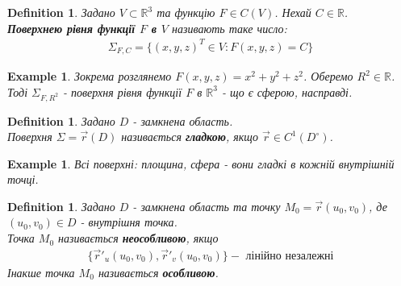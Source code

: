 \documentclass[a4paper, 10pt]{article}
\theoremstyle{theoremdd}
\theoremstyle{theoremdd}
\newtheorem{definition}[theorem]{Definition}
\theoremstyle{theoremdd}
\theoremstyle{theoremdd}
\newtheorem{example}[theorem]{Example}
\theoremstyle{theoremdd}
\theoremstyle{theoremdd}
\theoremstyle{theoremdd}
\theoremstyle{theoremdd}
\begin{document}
\begin{definition}
Задано $V \subset \mathbb{R}^3$ та функцію $F \in C(V)$. Нехай $C \in \mathbb{R}$.\\
\textbf{Поверхнею рівня функції $F$ в $V$} називають таке число:
\begin{align*}
\Sigma_{F,C} = \{ (x,y,z)^T \in V: F(x,y,z) = C\}
\end{align*}
\end{definition}

\begin{example}
Зокрема розглянемо $F(x,y,z) = x^2+y^2+z^2$. Оберемо $R^2 \in \mathbb{R}$.\\
Тоді $\Sigma_{F,R^2}$ - поверхня рівня функції $F$ в $\mathbb{R}^3$ - що є сферою, насправді.
\end{example}

\begin{definition}
Задано $D$ - замкнена область.\\
Поверхня $\Sigma = \vec{r}(D)$ називається \textbf{гладкою}, якщо $\vec{r} \in C^1(D^\circ)$.
\end{definition}

\begin{example}
Всі поверхні: площина, сфера - вони гладкі в кожній внутрішній точці.
\end{example}

\begin{definition}
Задано $D$ - замкнена область та точку $M_0 = \vec{r}(u_0,v_0)$, де $(u_0,v_0) \in D$ - внутрішня точка.\\
Точка $M_0$ називається \textbf{неособливою}, якщо
\begin{align*}
\{ \vec{r}'_u(u_0,v_0), \vec{r}'_v(u_0,v_0) \} - \text{ лінійно незалежні}
\end{align*}
Інакше точка $M_0$ називається \textbf{особливою}.
\end{definition}
\end{document}
